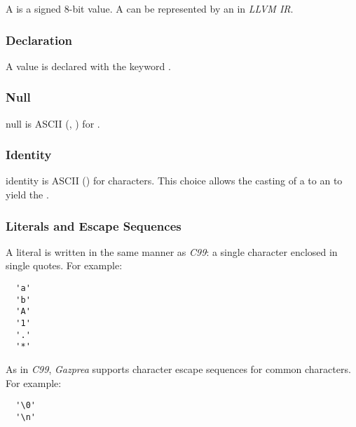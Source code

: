 \documentclass[types.tex]{subfiles}
\begin{document}
A  is a signed 8-bit value. A  can be represented by an 
in \textit{LLVM IR}.

\subsubsection{Declaration}
\label{sssec:character_decl}
A  value is declared with the keyword .

\subsubsection{Null}
\textsf{null} is ASCII  (, ) for .

\subsubsection{Identity}
\textsf{identity} is ASCII  () for characters. This choice allows the casting
of a  to an  to yield the  .

\subsubsection{Literals and Escape Sequences}
A  literal is written in the same manner as \textit{C99}: a single character
enclosed in single quotes. For example:
\begin{lstlisting}
  'a'
  'b'
  'A'
  '1'
  '.'
  '*'
\end{lstlisting}

As in \textit{C99}, \textit{Gazprea} supports character escape sequences for common characters. For
example:
\begin{lstlisting}
  '\0'
  '\n'
\end{lstlisting}
\end{document}
